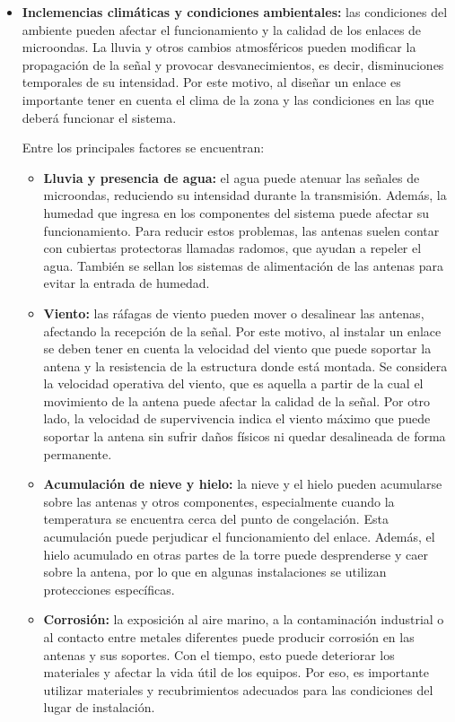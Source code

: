 \documentclass[11pt,a4paper]{article}
\begin{document}
\begin{enumerate}[label=4.\arabic*), itemsep=0.3cm]
\begin{itemize}
          \item \textbf{Inclemencias climáticas y condiciones ambientales:}
          las condiciones del ambiente pueden afectar el funcionamiento y la calidad de los enlaces de microondas. La lluvia y otros cambios atmosféricos pueden modificar la propagación de la señal y provocar desvanecimientos, es decir, disminuciones temporales de su intensidad. Por este motivo, al diseñar un enlace es importante tener en cuenta el clima de la zona y las condiciones en las que deberá funcionar el sistema.

          Entre los principales factores se encuentran:
          \begin{itemize}
            \item \textbf{Lluvia y presencia de agua:}
            el agua puede atenuar las señales de microondas, reduciendo su intensidad durante la transmisión. Además, la humedad que ingresa en los componentes del sistema puede afectar su funcionamiento. Para reducir estos problemas, las antenas suelen contar con cubiertas protectoras llamadas radomos, que ayudan a repeler el agua. También se sellan los sistemas de alimentación de las antenas para evitar la entrada de humedad.

            \item \textbf{Viento:}
            las ráfagas de viento pueden mover o desalinear las antenas, afectando la recepción de la señal. Por este motivo, al instalar un enlace se deben tener en cuenta la velocidad del viento que puede soportar la antena y la resistencia de la estructura donde está montada. Se considera la velocidad operativa del viento, que es aquella a partir de la cual el movimiento de la antena puede afectar la calidad de la señal. Por otro lado, la velocidad de supervivencia indica el viento máximo que puede soportar la antena sin sufrir daños físicos ni quedar desalineada de forma permanente.

            \item \textbf{Acumulación de nieve y hielo:}
            la nieve y el hielo pueden acumularse sobre las antenas y otros componentes, especialmente cuando la temperatura se encuentra cerca del punto de congelación. Esta acumulación puede perjudicar el funcionamiento del enlace. Además, el hielo acumulado en otras partes de la torre puede desprenderse y caer sobre la antena, por lo que en algunas instalaciones se utilizan protecciones específicas.

            \item \textbf{Corrosión:}
            la exposición al aire marino, a la contaminación industrial o al contacto entre metales diferentes puede producir corrosión en las antenas y sus soportes. Con el tiempo, esto puede deteriorar los materiales y afectar la vida útil de los equipos. Por eso, es importante utilizar materiales y recubrimientos adecuados para las condiciones del lugar de instalación.


\end{itemize}
\end{itemize}
\end{enumerate}
\end{document}
